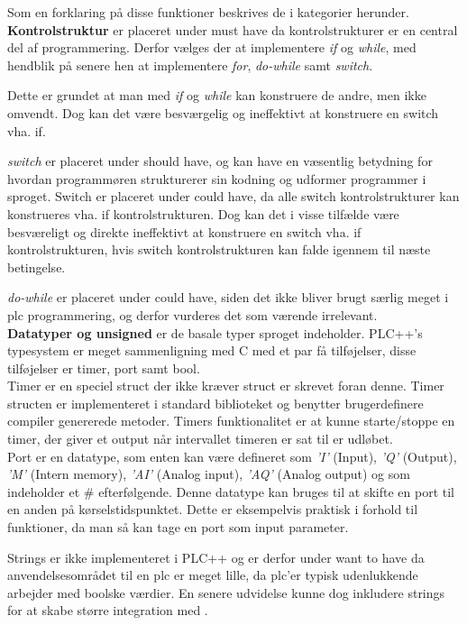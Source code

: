 \noindent Som en forklaring på disse funktioner beskrives de i kategorier herunder.\\

\noindent\textbf{Kontrolstruktur}
er placeret under must have da kontrolstrukturer er en central del af programmering.
Derfor vælges der at implementere \textit{if} og \textit{while}, med hendblik på senere hen at implementere \textit{for}, \textit{do-while} samt \textit{switch}.

Dette er grundet at man med \textit{if} og \textit{while} kan konstruere de andre, men ikke omvendt. Dog kan det være besværgelig og ineffektivt at konstruere en switch vha. if.

\textit{switch} er placeret under should have, og kan have en væsentlig betydning for hvordan programmøren strukturerer sin kodning og udformer programmer i sproget.
Switch er placeret under could have, da alle switch kontrolstrukturer kan konstrueres vha. if kontrolstrukturen. Dog kan det i visse tilfælde være besværeligt og direkte ineffektivt at konstruere en switch vha. if kontrolstrukturen, hvis switch kontrolstrukturen kan falde igennem til næste betingelse.

\textit{do-while} er placeret under could have, siden det ikke bliver brugt særlig meget i \gls{plc} programmering, og derfor vurderes det som værende irrelevant.\\

\noindent\textbf{Datatyper og unsigned}
er de basale typer sproget indeholder. PLC++'s typesystem er meget sammenligning med C med et par få tilføjelser, disse tilføjelser er timer, port samt bool.\\
Timer er en speciel struct der ikke kræver struct er skrevet foran denne. Timer structen er implementeret i standard biblioteket og benytter brugerdefinere compiler genererede metoder. Timers funktionalitet er at kunne starte/stoppe en timer, der giver et output når intervallet timeren er sat til er udløbet.\\
Port er en datatype, som enten kan være defineret som \textit{'I'} (Input), \textit{'Q'} (Output), \textit{'M'} (Intern memory), \textit{'AI'} (Analog input), \textit{'AQ'} (Analog output) og som indeholder et \# efterfølgende. Denne datatype kan bruges til at skifte en port til en anden på kørselstidspunktet. Dette er eksempelvis praktisk i forhold til funktioner, da man så kan tage en port som input parameter.

Strings er ikke implementeret i PLC++ og er derfor under want to have da anvendelsesområdet til en \gls{plc} er meget lille, da \gls{plc}'er typisk udenlukkende arbejder med boolske værdier. En senere udvidelse kunne dog inkludere strings for at skabe større integration med .


